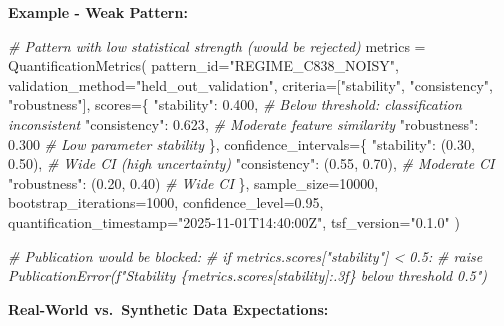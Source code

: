 \documentclass[
]{article}
\newenvironment{Shaded}{}{}
\newcommand{\CommentTok}[1]{\textcolor[rgb]{0.38,0.63,0.69}{\textit{#1}}}
\newcommand{\DecValTok}[1]{\textcolor[rgb]{0.25,0.63,0.44}{#1}}
\newcommand{\FloatTok}[1]{\textcolor[rgb]{0.25,0.63,0.44}{#1}}
\newcommand{\NormalTok}[1]{#1}
\newcommand{\OperatorTok}[1]{\textcolor[rgb]{0.40,0.40,0.40}{#1}}
\newcommand{\StringTok}[1]{\textcolor[rgb]{0.25,0.44,0.63}{#1}}
\begin{document}
\textbf{Example - Weak Pattern:}

\begin{Shaded}
\begin{Highlighting}[]
\CommentTok{\# Pattern with low statistical strength (would be rejected)}
\NormalTok{metrics }\OperatorTok{=}\NormalTok{ QuantificationMetrics(}
\NormalTok{    pattern\_id}\OperatorTok{=}\StringTok{"REGIME\_C838\_NOISY"}\NormalTok{,}
\NormalTok{    validation\_method}\OperatorTok{=}\StringTok{"held\_out\_validation"}\NormalTok{,}
\NormalTok{    criteria}\OperatorTok{=}\NormalTok{[}\StringTok{"stability"}\NormalTok{, }\StringTok{"consistency"}\NormalTok{, }\StringTok{"robustness"}\NormalTok{],}
\NormalTok{    scores}\OperatorTok{=}\NormalTok{\{}
        \StringTok{"stability"}\NormalTok{: }\FloatTok{0.400}\NormalTok{,                }\CommentTok{\# Below threshold: classification inconsistent}
        \StringTok{"consistency"}\NormalTok{: }\FloatTok{0.623}\NormalTok{,              }\CommentTok{\# Moderate feature similarity}
        \StringTok{"robustness"}\NormalTok{: }\FloatTok{0.300}                \CommentTok{\# Low parameter stability}
\NormalTok{    \},}
\NormalTok{    confidence\_intervals}\OperatorTok{=}\NormalTok{\{}
        \StringTok{"stability"}\NormalTok{: (}\FloatTok{0.30}\NormalTok{, }\FloatTok{0.50}\NormalTok{),         }\CommentTok{\# Wide CI (high uncertainty)}
        \StringTok{"consistency"}\NormalTok{: (}\FloatTok{0.55}\NormalTok{, }\FloatTok{0.70}\NormalTok{),       }\CommentTok{\# Moderate CI}
        \StringTok{"robustness"}\NormalTok{: (}\FloatTok{0.20}\NormalTok{, }\FloatTok{0.40}\NormalTok{)         }\CommentTok{\# Wide CI}
\NormalTok{    \},}
\NormalTok{    sample\_size}\OperatorTok{=}\DecValTok{10000}\NormalTok{,}
\NormalTok{    bootstrap\_iterations}\OperatorTok{=}\DecValTok{1000}\NormalTok{,}
\NormalTok{    confidence\_level}\OperatorTok{=}\FloatTok{0.95}\NormalTok{,}
\NormalTok{    quantification\_timestamp}\OperatorTok{=}\StringTok{"2025{-}11{-}01T14:40:00Z"}\NormalTok{,}
\NormalTok{    tsf\_version}\OperatorTok{=}\StringTok{"0.1.0"}
\NormalTok{)}

\CommentTok{\# Publication would be blocked:}
\CommentTok{\# if metrics.scores["stability"] \textless{} 0.5:}
\CommentTok{\#     raise PublicationError(f"Stability \{metrics.scores[\textquotesingle{}stability\textquotesingle{}]:.3f\} below threshold 0.5")}
\end{Highlighting}
\end{Shaded}

\textbf{Real-World vs.~Synthetic Data Expectations:}
\end{document}
